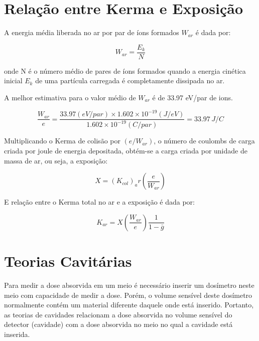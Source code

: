 \documentclass[11pt,a4paper]{article}
\newcounter{exemplo}
\begin{document}
	\section{Relação entre Kerma e Exposição}

		A energia média liberada no ar por par de íons formados $W_{ar}$ é dada por:

			\begin{equation}
				W_{ar} = \frac{E_k}{N}
			\end{equation}

		\noindent onde N é o número médio de pares de íons formados quando a energia cinética inicial $E_k$ de uma partícula carregada é completamente dissipada no ar.

		\begin{exemplo}
			A melhor estimativa para o valor médio de $W_{ar}$ é de 33.97 eV/par de ions.

			\begin{equation}
				\frac{W_{ar}}{e} 
				= \frac{33.97 (eV/par)\times 1.602 \times 10^{-19} (J/eV)}{1.602 \times 10^{-19}(C/par)}
				= 33.97 \, J/C
			\end{equation}
		\end{exemplo}

		Multiplicando o Kerma de colisão por $(e/W_{ar})$, o número de coulombs de carga criada por joule de energia depositada, obtém-se a carga criada por unidade de massa de ar, ou seja, a exposição:

			\begin{equation}
				X = (K_{col})_ar \left(\frac{e}{W_{ar}}\right)
			\end{equation}

		E relação entre o Kerma total no ar e a exposição é dada por:

			\begin{equation}
				K_{ar} = X \left(\frac{W_{ar}}{e}\right) \frac{1}{1 - \bar{g}}
			\end{equation}

	\section{Teorias Cavitárias}

		Para medir a dose absorvida em um meio é necessário inserir um dosímetro neste meio com capacidade de medir a dose. Porém, o volume sensível deste dosímetro normalmente contém um material diferente daquele onde está inserido. Portanto, as teorias de cavidades relacionam a dose absorvida no volume sensível do detector (cavidade) com a dose absorvida no meio no qual a cavidade está inserida. 
\end{document}
